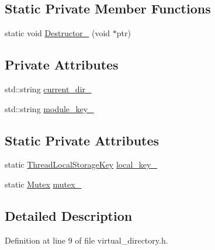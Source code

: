 \subsection*{Static Private Member Functions}
\begin{DoxyCompactItemize}
\item 
static void \hyperlink{classmocha_1_1_virtual_directory_a565ed325a2b97303689fa1ac7c2a3553}{Destructor\_\-} (void $\ast$ptr)
\end{DoxyCompactItemize}
\subsection*{Private Attributes}
\begin{DoxyCompactItemize}
\item 
std::string \hyperlink{classmocha_1_1_virtual_directory_acefb1f5f405adc754878aefabc10af65}{current\_\-dir\_\-}
\item 
std::string \hyperlink{classmocha_1_1_virtual_directory_a83d43f5ca023c7697322b2ca91bba902}{module\_\-key\_\-}
\end{DoxyCompactItemize}
\subsection*{Static Private Attributes}
\begin{DoxyCompactItemize}
\item 
static \hyperlink{classmocha_1_1_thread_local_storage_key}{ThreadLocalStorageKey} \hyperlink{classmocha_1_1_virtual_directory_a048a3ff55c59332590f6b12cb2136084}{local\_\-key\_\-}
\item 
static \hyperlink{classmocha_1_1_mutex}{Mutex} \hyperlink{classmocha_1_1_virtual_directory_a9492b47fe38abea4be3cd74cd81148fb}{mutex\_\-}
\end{DoxyCompactItemize}


\subsection{Detailed Description}


Definition at line 9 of file virtual\_\-directory.h.



